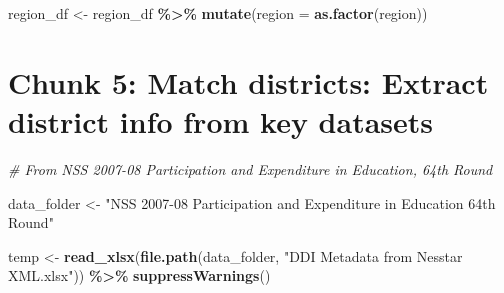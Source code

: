 \documentclass[
]{article}
\newenvironment{Shaded}{\begin{snugshade}}{\end{snugshade}}
\newcommand{\AttributeTok}[1]{\textcolor[rgb]{0.13,0.29,0.53}{#1}}
\newcommand{\CommentTok}[1]{\textcolor[rgb]{0.56,0.35,0.01}{\textit{#1}}}
\newcommand{\FunctionTok}[1]{\textcolor[rgb]{0.13,0.29,0.53}{\textbf{#1}}}
\newcommand{\NormalTok}[1]{#1}
\newcommand{\OtherTok}[1]{\textcolor[rgb]{0.56,0.35,0.01}{#1}}
\newcommand{\SpecialCharTok}[1]{\textcolor[rgb]{0.81,0.36,0.00}{\textbf{#1}}}
\newcommand{\StringTok}[1]{\textcolor[rgb]{0.31,0.60,0.02}{#1}}
\begin{document}
\begin{Shaded}
\begin{Highlighting}[]
\NormalTok{region\_df }\OtherTok{\textless{}{-}}\NormalTok{ region\_df }\SpecialCharTok{\%\textgreater{}\%} 
  \FunctionTok{mutate}\NormalTok{(}\AttributeTok{region =} \FunctionTok{as.factor}\NormalTok{(region))}
\end{Highlighting}
\end{Shaded}

\section*{Chunk 5: Match districts: Extract district info from key datasets}\label{chunk-5-match-districts-extract-district-info-from-key-datasets}

\begin{Shaded}
\begin{Highlighting}[]
\CommentTok{\# From NSS 2007{-}08 Participation and Expenditure in Education, 64th Round}

\NormalTok{data\_folder }\OtherTok{\textless{}{-}} \StringTok{"NSS 2007{-}08 Participation and Expenditure in Education 64th Round"}

\NormalTok{temp }\OtherTok{\textless{}{-}} \FunctionTok{read\_xlsx}\NormalTok{(}\FunctionTok{file.path}\NormalTok{(data\_folder, }\StringTok{"DDI Metadata from Nesstar XML.xlsx"}\NormalTok{)) }\SpecialCharTok{\%\textgreater{}\%} 
  \FunctionTok{suppressWarnings}\NormalTok{()}


\end{Highlighting}
\end{Shaded}
\end{document}
